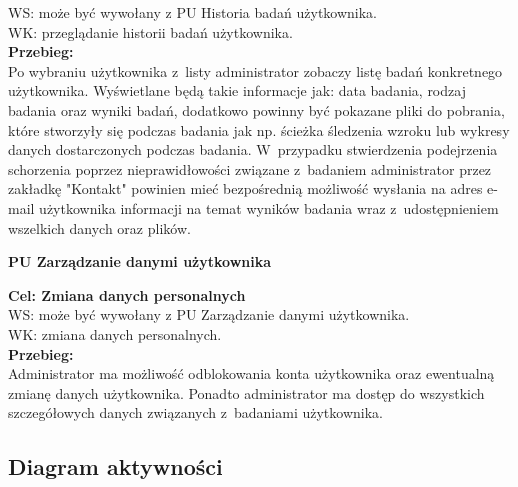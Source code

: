 \documentclass[12pt, letterpaper]{article}
\begin{document}
		WS: może być wywołany z PU Historia badań użytkownika.\\
		
		WK: przeglądanie historii badań użytkownika. \\
		
		\textbf{Przebieg:}\\
		Po wybraniu użytkownika z~listy administrator zobaczy listę badań konkretnego użytkownika. Wyświetlane będą takie informacje jak: data badania, rodzaj badania oraz wyniki badań, dodatkowo powinny być pokazane pliki do pobrania, które stworzyły się podczas badania jak np. ścieżka śledzenia wzroku lub wykresy danych dostarczonych podczas badania. W~przypadku stwierdzenia podejrzenia schorzenia poprzez nieprawidłowości związane z~badaniem administrator przez zakładkę "Kontakt" powinien mieć bezpośrednią możliwość wysłania na adres e-mail użytkownika informacji na temat wyników badania wraz z~udostępnieniem wszelkich danych oraz plików.
		
		
		\newpage		
		
		\textbf{PU Zarządzanie danymi użytkownika}
		
		\quad
		
		\textbf{Cel: Zmiana danych personalnych}\\
		
		WS: może być wywołany z PU Zarządzanie danymi użytkownika.\\
		
		WK: zmiana danych personalnych.\\
		
		\textbf{Przebieg:}\\
		Administrator ma możliwość odblokowania konta użytkownika oraz ewentualną zmianę danych użytkownika. Ponadto administrator ma dostęp do wszystkich szczegółowych danych związanych z~badaniami użytkownika.
		 \\
		

		

		\subsection{Diagram aktywności}
		
\end{document}
